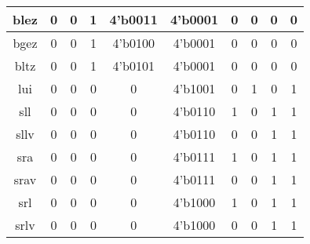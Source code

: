 \documentclass[UTF8]{ctexart}
\begin{document}
\begin{table}[H]
\begin{threeparttable}
\begin{tabular}{|c|c|c|c|c|c|c|c|c|c|}
			\hline
			blez                                     & 0                 & 0                 & 1               & 4'b0011           & 4'b0001          & 0                & 0               & 0               & 0                 \\
			\hline
			bgez                                     & 0                 & 0                 & 1               & 4'b0100           & 4'b0001          & 0                & 0               & 0               & 0                 \\
			\hline
			bltz                                     & 0                 & 0                 & 1               & 4'b0101           & 4'b0001          & 0                & 0               & 0               & 0                 \\
			\hline
			lui                                      & 0                 & 0                 & 0               & 0                 & 4'b1001          & 0                & 1               & 0               & 1                 \\
			\hline
			sll                                      & 0                 & 0                 & 0               & 0                 & 4'b0110          & 1                & 0               & 1               & 1                 \\
			\hline
			sllv                                     & 0                 & 0                 & 0               & 0                 & 4'b0110          & 0                & 0               & 1               & 1                 \\
			\hline
			sra                                      & 0                 & 0                 & 0               & 0                 & 4'b0111          & 1                & 0               & 1               & 1                 \\
			\hline
			srav                                     & 0                 & 0                 & 0               & 0                 & 4'b0111          & 0                & 0               & 1               & 1                 \\
			\hline
			srl                                      & 0                 & 0                 & 0               & 0                 & 4'b1000          & 1                & 0               & 1               & 1                 \\
			\hline
			srlv                                     & 0                 & 0                 & 0               & 0                 & 4'b1000          & 0                & 0               & 1               & 1                 \\

\end{tabular}
\end{threeparttable}
\end{table}
\end{document}
